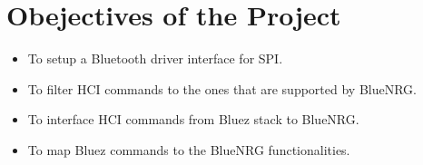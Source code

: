 \section{Obejectives of the Project}
\begin{itemize}
	\item To setup a Bluetooth driver interface for SPI.
	\item To filter HCI commands to the ones that are supported by BlueNRG.
	\item To interface HCI commands from Bluez stack to BlueNRG.
	\item To map Bluez commands to the BlueNRG functionalities.
\end{itemize}
